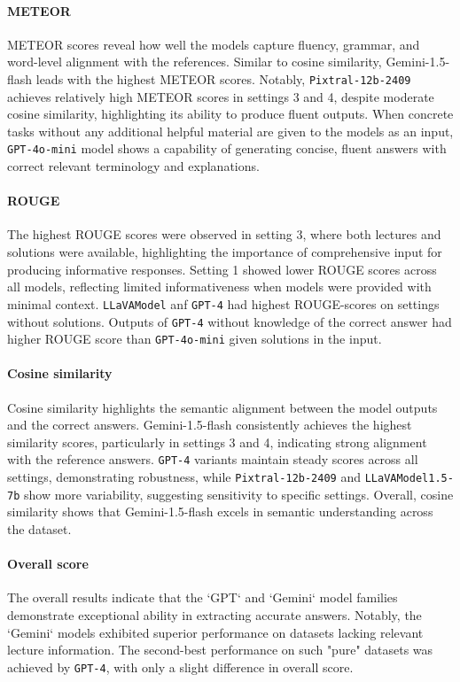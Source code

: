 \documentclass{article}
\begin{document}
\paragraph{METEOR}
METEOR scores reveal how well the models capture fluency, grammar, and word-level alignment with the references. Similar to cosine similarity, {Gemini-1.5-flash} leads with the highest METEOR scores. Notably, \texttt{Pixtral-12b-2409} achieves relatively high METEOR scores in settings 3 and 4, despite moderate cosine similarity, highlighting its ability to produce fluent outputs. When concrete tasks without any additional helpful material are given to the models as an input, \texttt{GPT-4o-mini} model shows a capability of generating concise, fluent answers with correct relevant terminology and explanations.

\paragraph{ROUGE}
The highest ROUGE scores were observed in setting 3, where both lectures and solutions were available, highlighting the importance of comprehensive input for producing informative responses. Setting 1 showed lower ROUGE scores across all models, reflecting limited informativeness when models were provided with minimal context.  \texttt{LLaVAModel} anf \texttt{GPT-4} had highest ROUGE-scores on settings without solutions. Outputs of \texttt{GPT-4} without knowledge of the correct answer had higher ROUGE score than \texttt{GPT-4o-mini} given solutions in the input.


\paragraph{Cosine similarity}
Cosine similarity highlights the semantic alignment between the model outputs and the correct answers. {Gemini-1.5-flash} consistently achieves the highest similarity scores, particularly in settings 3 and 4, indicating strong alignment with the reference answers. \texttt{GPT-4} variants maintain steady scores across all settings, demonstrating robustness, while \texttt{Pixtral-12b-2409} and \texttt{LLaVAModel1.5-7b} show more variability, suggesting sensitivity to specific settings. Overall, cosine similarity shows that {Gemini-1.5-flash} excels in semantic understanding across the dataset.

\paragraph{Overall score}
The overall results indicate that the `GPT` and `Gemini` model families demonstrate exceptional ability in extracting accurate answers. Notably, the `Gemini` models exhibited superior performance on datasets lacking relevant lecture information. The second-best performance on such "pure" datasets was achieved by \texttt{GPT-4}, with only a slight difference in overall score.
\end{document}
